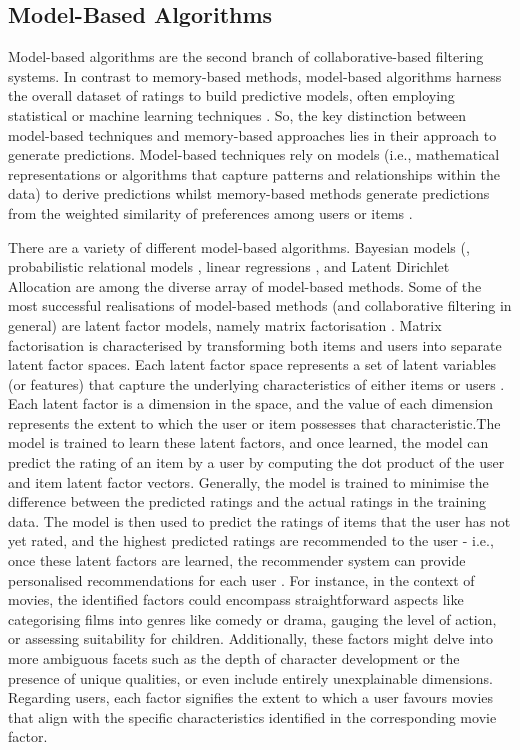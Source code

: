 \subsection{Model-Based Algorithms}
\label{subsec:2 Model-Based Algorithms}

Model-based algorithms are the second branch of collaborative-based filtering systems. In contrast to memory-based methods, model-based algorithms harness the overall dataset of ratings to build predictive models, often employing statistical or machine learning techniques \cite{adomavicius2005toward}. So, the key distinction between model-based techniques and memory-based approaches lies in their approach to generate predictions. Model-based techniques rely on models (i.e., mathematical representations or algorithms that capture patterns and relationships within the data) to derive predictions whilst memory-based methods generate predictions from the weighted similarity of preferences among users or items \cite{adomavicius2005toward}.

There are a variety of different model-based algorithms. Bayesian models (\cite{chien1999bayesian}, probabilistic relational models \cite{getoor1999using}, linear regressions \cite{sarwar2001item}, and Latent Dirichlet Allocation \cite{marlin2003modeling} are among the diverse array of model-based methods. Some of the most successful realisations of model-based methods (and collaborative filtering in general) are latent factor models, namely matrix factorisation \cite{koren2009matrix}. Matrix factorisation is characterised by transforming both items and users into separate latent factor spaces. Each latent factor space represents a set of latent variables (or features) that capture the underlying characteristics of either items or users \cite{koren2009matrix}. Each latent factor is a dimension in the space, and the value of each dimension represents the extent to which the user or item possesses that characteristic.The model is trained to learn these latent factors, and once learned, the model can predict the rating of an item by a user by computing the dot product of the user and item latent factor vectors. Generally, the model is trained to minimise the difference between the predicted ratings and the actual ratings in the training data. The model is then used to predict the ratings of items that the user has not yet rated, and the highest predicted ratings are recommended to the user - i.e., once these latent factors are learned, the recommender system can provide personalised recommendations for each user \cite{koren2008factorization}. For instance, in the context of movies, the identified factors could encompass straightforward aspects like categorising films into genres like comedy or drama, gauging the level of action, or assessing suitability for children. Additionally, these factors might delve into more ambiguous facets such as the depth of character development or the presence of unique qualities, or even include entirely unexplainable dimensions. Regarding users, each factor signifies the extent to which a user favours movies that align with the specific characteristics identified in the corresponding movie factor.

